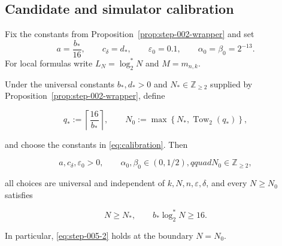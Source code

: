 \subsection{Candidate and simulator calibration}\label{app:step-005}
Fix the constants from Proposition~\ref{prop:step-002-wrapper} and set
\begin{equation}
a=\frac{b_*}{16},
\qquad c_\delta=d_*,
\qquad \varepsilon_0=0.1,
\qquad \alpha_0=\beta_0=2^{-13}.
\tag{S5.C1}\label{eq:calibration}
\end{equation}
For local formulas write $L_N=\log_2^*N$ and $M=m_{n,k}$.
\begin{lemma}\label{lem:step-005-calibration}
Under the universal constants \(b_*,d_*>0\) and
\(N_*\in\mathbb Z_{\ge2}\) supplied by Proposition~\ref{prop:step-002-wrapper}, define

\[
q_*:=\left\lceil\frac{16}{b_*}\right\rceil,
\qquad
N_0:=\max\left\{N_*,\operatorname{Tow}_2(q_*)\right\},
\tag{S5.1}\label{eq:step-005-1}
\]

and choose the constants in \eqref{eq:calibration}. Then

\[
a,c_\delta,\varepsilon_0>0,\qquad
\alpha_0,\beta_0\in(0,1/2),qquad
N_0\in\mathbb Z_{\ge2},
\]

all choices are universal and independent of \(k,N,n,\varepsilon,\delta\),
and every \(N\ge N_0\) satisfies

\[
N\ge N_*,
\qquad
b_*\log_2^*N\ge16.
\tag{S5.2}\label{eq:step-005-2}
\]

In particular, \eqref{eq:step-005-2} holds at the boundary \(N=N_0\).
\end{lemma}

